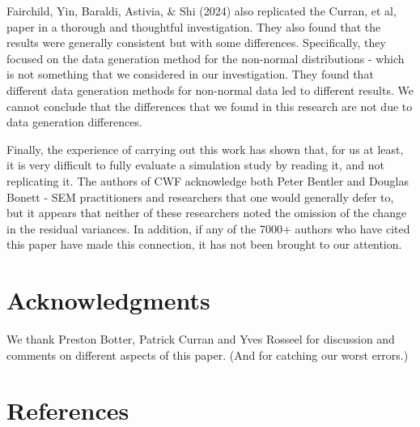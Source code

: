 \documentclass[
  letterpaper,
  DIV=11,
  numbers=noendperiod]{scrartcl}
\begin{document}
Fairchild, Yin, Baraldi, Astivia, \& Shi (2024) also replicated the
Curran, et al, paper in a thorough and thoughtful investigation. They
also found that the results were generally consistent but with some
differences. Specifically, they focused on the data generation method
for the non-normal distributions - which is not something that we
considered in our investigation. They found that different data
generation methods for non-normal data led to different results. We
cannot conclude that the differences that we found in this research are
not due to data generation differences.

Finally, the experience of carrying out this work has shown that, for us
at least, it is very difficult to fully evaluate a simulation study by
reading it, and not replicating it. The authors of CWF acknowledge both
Peter Bentler and Douglas Bonett - SEM practitioners and researchers
that one would generally defer to, but it appears that neither of these
researchers noted the omission of the change in the residual variances.
In addition, if any of the 7000+ authors who have cited this paper have
made this connection, it has not been brought to our attention.

\section{Acknowledgments}\label{acknowledgments}

We thank Preston Botter, Patrick Curran and Yves Rosseel for discussion
and comments on different aspects of this paper. (And for catching our
worst errors.)

\section*{References}\label{references}
\end{document}
